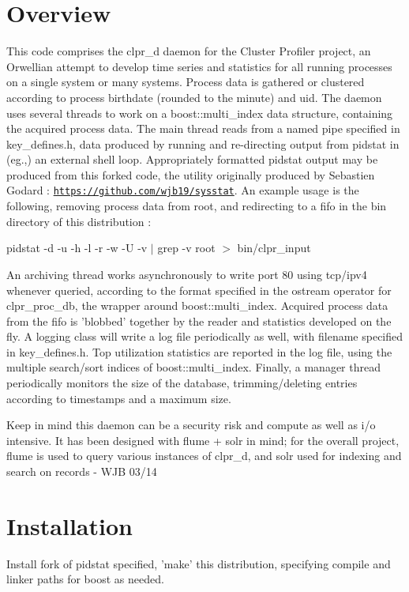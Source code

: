 \hypertarget{index_Overview}{}\section{\-Overview}\label{index_Overview}
\-This code comprises the clpr\-\_\-d daemon for the \-Cluster \-Profiler project, an \-Orwellian attempt to develop time series and statistics for all running processes on a single system or many systems. \-Process data is gathered or clustered according to process birthdate (rounded to the minute) and uid. \-The daemon uses several threads to work on a boost\-::multi\-\_\-index data structure, containing the acquired process data. \-The main thread reads from a named pipe specified in key\-\_\-defines.\-h, data produced by running and re-\/directing output from pidstat in (eg.,) an external shell loop. \-Appropriately formatted pidstat output may be produced from this forked code, the utility originally produced by \-Sebastien \-Godard \-: \href{https://github.com/wjb19/sysstat}{\tt https\-://github.\-com/wjb19/sysstat}. \-An example usage is the following, removing process data from root, and redirecting to a fifo in the bin directory of this distribution \-:

pidstat -\/d -\/u -\/h -\/l -\/r -\/w -\/\-U -\/v $|$ grep -\/v root $>$ bin/clpr\-\_\-input

\-An archiving thread works asynchronously to write port 80 using tcp/ipv4 whenever queried, according to the format specified in the ostream operator for clpr\-\_\-proc\-\_\-db, the wrapper around boost\-::multi\-\_\-index. \-Acquired process data from the fifo is 'blobbed' together by the reader and statistics developed on the fly. \-A logging class will write a log file periodically as well, with filename specified in key\-\_\-defines.\-h. \-Top utilization statistics are reported in the log file, using the multiple search/sort indices of boost\-::multi\-\_\-index. \-Finally, a manager thread periodically monitors the size of the database, trimming/deleting entries according to timestamps and a maximum size.

\-Keep in mind this daemon can be a security risk and compute as well as i/o intensive. \-It has been designed with flume + solr in mind; for the overall project, flume is used to query various instances of clpr\-\_\-d, and solr used for indexing and search on records -\/ \-W\-J\-B 03/14\hypertarget{index_Installation}{}\section{\-Installation}\label{index_Installation}
\-Install fork of pidstat specified, 'make' this distribution, specifying compile and linker paths for boost as needed. 